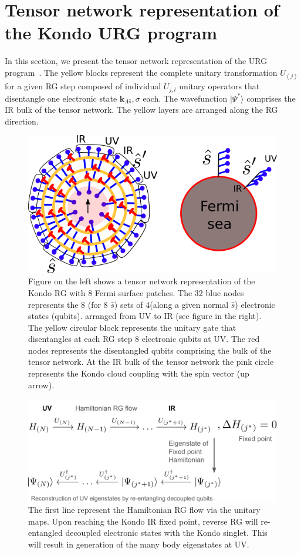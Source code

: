 \documentclass[aps,prl,preprint,groupedaddress]{revtex4-2}
\begin{document}
\section{Tensor network representation of the Kondo URG program}
\par\noindent
In this section, we present the tensor network representation of the URG program~\cite{anirbanurg1,mukherjee2020}. The yellow blocks represent the complete unitary transformation $U_{(j)}$ for a given RG step composed of individual $U_{j,l}$ unitary operators that disentangle one electronic state $\mathbf{k}_{\Lambda\hat{s}},\sigma$ each. The wavefunction $|\Psi^{*}\rangle$ comprises the IR bulk of the tensor network. The yellow layers are arranged along the RG direction. 
\begin{figure}
\includegraphics[scale=1]{TNKondo.png}
\caption{Figure on the left shows a tensor network representation of the Kondo RG with  8 Fermi surface patches. The 32 blue nodes represents the 8 (for 8 $\hat{s}$) sets of 4(along a given normal $\hat{s}$) electronic states (qubits).  arranged from UV to IR (see figure in the right). The yellow circular block represents the unitary gate that disentangles at each RG step 8 electronic qubits at UV. The red nodes represents the disentangled qubits comprising the bulk of the tensor network. At the IR bulk of the tensor network the pink circle represents the Kondo cloud coupling with the spin vector (up arrow).} \label{KondoTN}
\end{figure}
\begin{figure}
\includegraphics[width=\textwidth]{flowChart.png}
\caption{The first line represent the Hamiltonian RG flow via the unitary maps. Upon reaching the Kondo IR fixed point, reverse RG will re-entangled decoupled electronic states with the Kondo singlet. This will result in generation of the many body eigenstates at UV.}  \label{eigenUV}
\end{figure}
\end{document}
